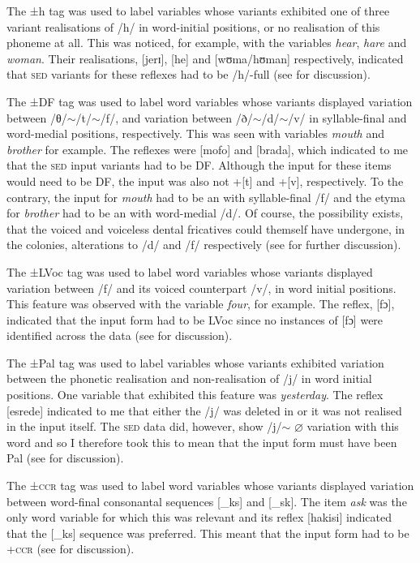 {The {±h} tag was used to label variables whose variants exhibited one of three variant realisations of /h/ in word-initial positions, or no realisation of this phoneme at all. This was noticed, for example, with the variables \emph{hear}, \emph{hare} and \emph{woman}. Their  realisations, [jerɪ], [he] and [wʊma\slash hʊman] respectively, indicated that \textsc{sed} variants for these reflexes had to be /h/-full (see  for discussion).

The {±DF} tag was used to label word variables whose variants displayed variation between /θ/$\sim$/t/$\sim$/f/, and variation between /ð/$\sim$/d/$\sim$/v/ in syllable-final and word-medial positions, respectively. This was seen with variables \emph{mouth} and \emph{brother} for example. The  reflexes were [mofo] and [brada], which indicated to me that the \textsc{sed} input variants had to be \textminus DF. Although the input for these items would need to be \textminus DF, the input was also not +[t] and +[v], respectively. To the contrary, the input for \emph{mouth}  had to be an  with syllable-final /f/ and the etyma for \emph{brother}  had to be an  with word-medial /d/. Of course, the possibility exists, that the voiced and voiceless dental fricatives could themself have undergone, in the colonies, alterations to /d/ and /f/ respectively (see  for further discussion).

The {±LVoc} tag was used to label word variables whose variants displayed variation between /f/ and its voiced counterpart /v/, in word initial positions. This feature was observed with the variable \emph{four}, for example. The  reflex, [fɔ], indicated that the input form had to be \textminus LVoc since no instances of [fɔ] were identified across the  data (see  for discussion).

The {±Pal} tag was used to label variables whose variants exhibited variation between the phonetic realisation and non-realisation of /j/ in word initial positions. One variable that exhibited this feature was \emph{yesterday}. The  reflex [esrede]  indicated to me that either the /j/ was deleted in  or it was not realised in the input itself. The \textsc{sed} data did, however, show /j/$\sim$ $\varnothing$ variation with this word and so I therefore took this to mean that the input form must have been \textminus Pal (see  for discussion).

The {±\textsc{ccr} } tag was used to label word variables whose variants displayed variation between word-final consonantal sequences [{\_}ks] and [{\_}sk]. The item \emph{ask} was the only word variable for which this was relevant and its  reflex [hakisi]  indicated that the [{\_}ks] sequence was preferred. This meant that the input form had to be +\textsc{ccr} (see  for discussion).

}
